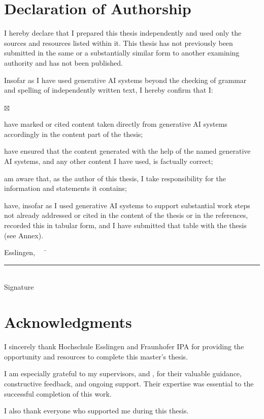 \chapter*{Declaration of Authorship}

I hereby declare that I prepared this thesis independently and used only the sources and
resources listed within it. This thesis has not previously been submitted in the same or a
substantially similar form to another examining authority and has not been published.

\noindent Insofar as I have used generative AI systems beyond the checking of grammar and
spelling of independently written text, I hereby confirm that I:

\begin{list}{$\boxtimes$}{%
  \setlength{\leftmargin}{2em}\setlength{\itemsep}{0.5em}}
  \item have marked or cited content taken directly from generative AI systems accordingly
        in the content part of the thesis;
  \item have ensured that the content generated with the help of the named generative AI
        systems, and any other content I have used, is factually correct;
  \item am aware that, as the author of this thesis, I take responsibility for the
        information and statements it contains;
  \item have, insofar as I used generative AI systems to support substantial work steps not
        already addressed or cited in the content of the thesis or in the references,
        recorded this in tabular form, and I have submitted that table with the thesis
        (see Annex).
\end{list}

\vspace{2em}
\begin{tabbing}
  Esslingen, \workDatum ~~ \= \rule{5cm}{0.3mm}\\
                           \> Signature
\end{tabbing}

\newpage
\chapter*{Acknowledgments}

I sincerely thank Hochschule Esslingen and Fraunhofer IPA for providing the opportunity and resources to
complete this master's thesis.

I am especially grateful to my supervisors, \workPruefer and \workZweitPruefer, for their valuable
guidance, constructive feedback, and ongoing support. Their expertise was essential to the
successful completion of this work.

I also thank everyone who supported me during this thesis.
